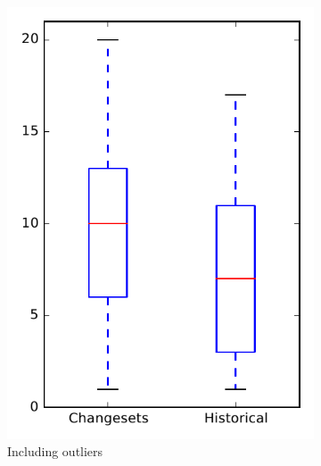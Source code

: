 
\begin{figure}
    \centering
    \begin{subfigure}{.4\textwidth}
        \centering
        \includegraphics[height=0.4\textheight]{figures/dit/rq2_pig}
        \caption{Including outliers}\label{fig:dit:rq2:pig_outlier}
    \end{subfigure}%
    \begin{subfigure}{.4\textwidth}
        \centering

\end{subfigure}
\end{figure}

